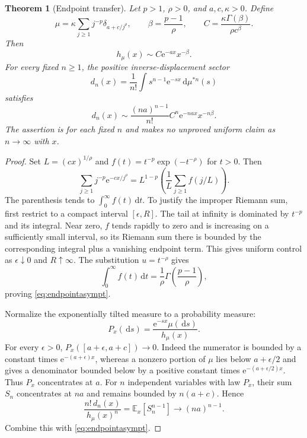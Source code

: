 \documentclass[11pt,a4paper]{article}
\newtheorem{theorem}{Theorem}[section]
\theoremstyle{definition}
\theoremstyle{remark}
\newcommand{\dd}{\,\mathrm d}
\newcommand{\e}{\mathrm e}
\numberwithin{equation}{section}
\begin{document}
\begin{theorem}[Endpoint transfer]\label{thm:endpoint}
Let $p>1$, $\rho>0$, and $a,c,\kappa>0$. Define
\begin{equation}\label{eq:endpointfamily}
 \mu=\kappa\sum_{j\ge1}j^{-p}\delta_{a+c/j^\rho},
 \qquad \beta=\frac{p-1}{\rho},\qquad
 C=\frac{\kappa\Gamma(\beta)}{\rho c^\beta}.
\end{equation}
Then
\begin{equation}\label{eq:endpointasympt}
 h_\mu(x)\sim C\e^{-ax}x^{-\beta}.
\end{equation}
For every fixed $n\ge1$, the positive inverse-displacement sector
\[
 d_n(x)=\frac1{n!}\int s^{n-1}\e^{-sx}\dd\mu^{*n}(s)
\]
satisfies
\begin{equation}\label{eq:dnleading}
 d_n(x)\sim\frac{(na)^{n-1}}{n!}C^n\e^{-nax}x^{-n\beta}.
\end{equation}
The assertion is for each fixed $n$ and makes no unproved uniform claim as $n\to\infty$ with $x$.
\end{theorem}
\begin{proof}
Set $L=(cx)^{1/\rho}$ and $f(t)=t^{-p}\exp(-t^{-\rho})$ for $t>0$. Then
\[
 \sum_{j\ge1}j^{-p}\e^{-cx/j^\rho}
 =L^{1-p}\left(\frac1L\sum_{j\ge1}f(j/L)\right).
\]
The parenthesis tends to $\int_0^\infty f(t)\dd t$. To justify the improper Riemann sum, first restrict to a compact interval $[\epsilon,R]$. The tail at infinity is dominated by $t^{-p}$ and its integral. Near zero, $f$ tends rapidly to zero and is increasing on a sufficiently small interval, so its Riemann sum there is bounded by the corresponding integral plus a vanishing endpoint term. This gives uniform control as $\epsilon\downarrow0$ and $R\uparrow\infty$. The substitution $u=t^{-\rho}$ gives
\[
 \int_0^\infty f(t)\dd t=\frac1\rho\Gamma\left(\frac{p-1}{\rho}\right),
\]
proving \eqref{eq:endpointasympt}.

Normalize the exponentially tilted measure to a probability measure:
\[
 P_x(\dd s)=\frac{\e^{-sx}\mu(\dd s)}{h_\mu(x)}.
\]
For every $\epsilon>0$, $P_x([a+\epsilon,a+c])\to0$. Indeed the numerator is bounded by a constant times $\e^{-(a+\epsilon)x}$, whereas a nonzero portion of $\mu$ lies below $a+\epsilon/2$ and gives a denominator bounded below by a positive constant times $\e^{-(a+\epsilon/2)x}$. Thus $P_x$ concentrates at $a$. For $n$ independent variables with law $P_x$, their sum $S_n$ concentrates at $na$ and remains bounded by $n(a+c)$. Hence
\[
 \frac{n!\,d_n(x)}{h_\mu(x)^n}
 =\mathbb E_x[S_n^{n-1}]\longrightarrow(na)^{n-1}.
\]
Combine this with \eqref{eq:endpointasympt}.
\end{proof}
\end{document}
